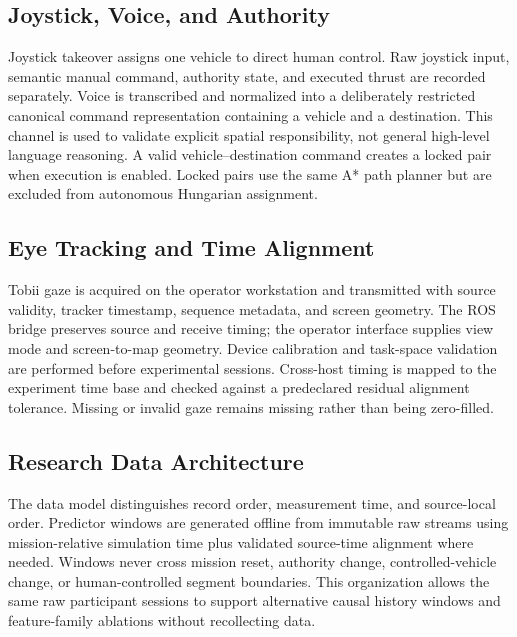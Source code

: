 \documentclass[conference]{IEEEtran}
\begin{document}
\subsection{Joystick, Voice, and Authority}

Joystick takeover assigns one vehicle to direct human control. Raw joystick
input, semantic manual command, authority state, and executed thrust are
recorded separately. Voice is transcribed and normalized into a deliberately restricted canonical
command representation containing a vehicle and a destination. This channel is
used to validate explicit spatial responsibility, not general high-level
language reasoning. A valid vehicle--destination command creates a locked pair
when execution is enabled. Locked pairs use the same A* path planner but are
excluded from autonomous Hungarian assignment.



\subsection{Eye Tracking and Time Alignment}

Tobii gaze is acquired on the operator workstation and transmitted with source
validity, tracker timestamp, sequence metadata, and screen geometry. The ROS
bridge preserves source and receive timing; the operator interface supplies
view mode and screen-to-map geometry. Device calibration and task-space
validation are performed before experimental sessions. Cross-host timing is
mapped to the experiment time base and checked against a predeclared residual
alignment tolerance. Missing or invalid gaze remains missing rather than being
zero-filled.

\subsection{Research Data Architecture}

The data model distinguishes record order, measurement time, and source-local
order. Predictor windows are generated offline from immutable raw streams using
mission-relative simulation time plus validated source-time alignment where
needed. Windows never cross mission reset, authority change, controlled-vehicle
change, or human-controlled segment boundaries. This organization allows the
same raw participant sessions to support alternative causal history windows and
feature-family ablations without recollecting data.
\end{document}

